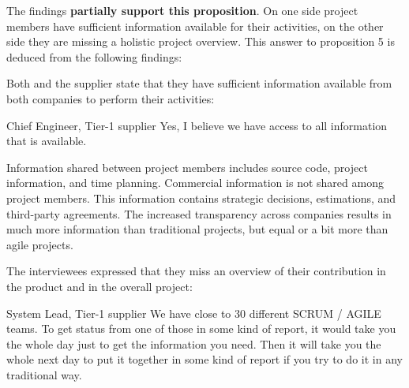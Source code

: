 The findings {\bf partially support this proposition}. On one side project members have sufficient information available for their activities, on the other side they are missing a holistic project overview. This answer to proposition 5 is deduced from the following findings:

 Both \company{} and the supplier state that they have sufficient information available from both companies to perform their activities:

\begin{aquote}{Chief Engineer, Tier-1 supplier}
Yes, I believe we have access to all information that is available.
\end{aquote}

Information shared between project members includes source code, project information, and time planning. 
Commercial information is not shared among project members. 
This information contains strategic decisions, estimations, and third-party agreements. 
The increased transparency across companies results in much more information than traditional projects, but equal or a bit more than agile projects. 

 The interviewees expressed that they miss an overview of their contribution in the product and in the overall project:



\begin{aquote}{System Lead, Tier-1 supplier}
We have close to 30 different SCRUM / AGILE teams. To get status from one of those in some kind of report, it would take you the whole day just to get the information you need. Then it will take you the whole next day to put it together in some kind of report if you try to do it in any traditional way. 
\end{aquote}

